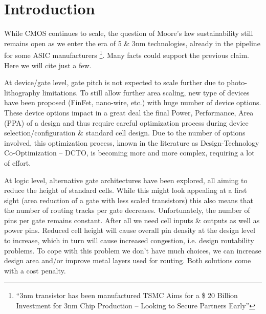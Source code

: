 \documentclass[conference]{IEEEtran}
\begin{document}

\section{Introduction}
While CMOS continues to scale, the question of Moore's law sustainability still remains open as we enter the era of 5 \& 3nm technologies, already in the pipeline for some ASIC manufacturers \footnote{``3nm transistor has been manufactured TSMC Aims for a \$ 20 Billion Investment for 3nm Chip Production – Looking to Secure Partners Early''}. Many facts could support the previous claim. Here we will cite just a few. 

At device/gate level, gate pitch is not expected to scale further due to photo-lithography limitations. To still allow further area scaling, new type of devices have been proposed (FinFet, nano-wire, etc.) with huge number of device options. These device options impact in a great deal the final Power, Performance, Area (PPA) of a design and thus require careful optimization process during device selection/configuration \& standard cell design. Due to the number of options involved, this optimization process, known in the literature as Design-Technology Co-Optimization -- DCTO, is becoming more and more complex, requiring a lot of effort.

At logic level, alternative gate architectures have been explored, all aiming to reduce the height of standard cells. While this might look appealing at a first sight (area reduction of a gate with less scaled transistors) this also means that the number of routing tracks per gate decreases. Unfortunately, the number of pins per gate remains constant. After all we need cell inputs \& outputs as well as power pins. Reduced cell height will cause overall pin density at the design level to increase, which in turn will cause increased congestion, i.e. design routability problems. To cope with this problem we don't have much choices, we can increase design area and/or improve metal layers used for routing. Both solutions come with a cost penalty. 
\end{document}
